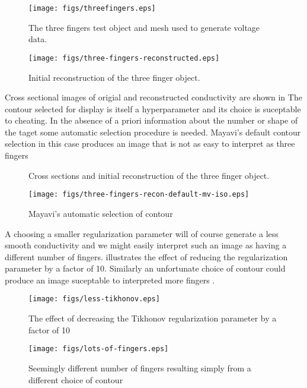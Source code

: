 \documentclass[12pt]{iopart}
\begin{document}
%
%
\begin{figure}[th]
\texttt{[image: figs/threefingers.eps]}
\caption{\label{fig:threefingers}The three fingers test object and mesh used to generate voltage data.}
\end{figure}



%
%
\begin{figure}[th]
\texttt{[image: figs/three-fingers-reconstructed.eps]}
\caption{\label{fig:3fingers1}
Initial reconstruction of the three finger object.}
\end{figure}

Cross sectional images of origial and reconstructed
conductivity are shown in 
The contour selected for display is itself a
hyperparameter and its choice is suceptable to
cheating. In the absence of a priori information about
the number or shape of the taget some automatic selection
procedure is needed. Mayavi's default contour selection
in this case produces an image that is not as easy to
interpret as three fingers 

%
%
\begin{figure}[th]

\caption{\label{fig:3fingersXsect}
Cross sections and initial reconstruction of the three finger object.}
\end{figure}

%
%
\begin{figure}[th]
\texttt{[image: figs/three-fingers-recon-default-mv-iso.eps]}
\caption{\label{fig:3fingersMVdefault}
Mayavi's automatic selection of contour}
\end{figure}
A choosing a smaller regularization parameter will of
course generate a less smooth conductivity and we might
easily interpret such an image as having a different number
of fingers.
 illustrates the effect of
reducing the regularization parameter by a factor of
10. Similarly an unfortunate choice of contour could
produce an image suceptable to interpreted more fingers
.
\begin{figure}[th]
\texttt{[image: figs/less-tikhonov.eps]}
\caption{\label{fig:3fingersLessTik}
The effect of decreasing the Tikhonov regularization parameter
 by a factor of 10}
\end{figure}
\begin{figure}[th]
\texttt{[image: figs/lots-of-fingers.eps]}
\caption{\label{fig:3fingersMoreFingers}
Seemingly different number of fingers resulting simply from a
 different choice of contour}
\end{figure}
\end{document}
